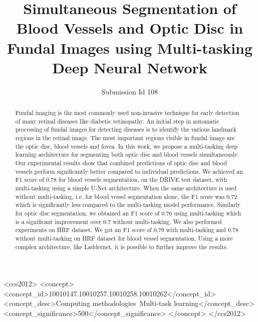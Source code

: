 \documentclass[sigconf, review=true]{acmart}
\begin{document}
\title{Simultaneous Segmentation of Blood Vessels and Optic Disc in Fundal Images using Multi-tasking Deep Neural Network}

\author{Submission Id 108}
\affiliation{%
  \institution{}
  \streetaddress{}
  \city{}
  \state{}
  \country{}
  \postcode{}
}


\renewcommand{\shortauthors}{}


\begin{abstract}
Fundal imaging is the most commonly used non-invasive technique for early detection of many retinal diseases like diabetic retinopathy.
An initial step in automatic processing of fundal images for detecting diseases is to identify the various landmark regions in the retinal image.
The most important regions visible in fundal image are the optic disc, blood vessels and fovea.
In this work, we propose a multi-tasking deep learning architecture for segmenting both optic disc and blood vessels simultaneously.
Our experimental results show that combined predictions of optic disc and blood vessels  perform significantly better compared to individual predictions.
We achieved an F1 score of 0.78 for blood vessels segmentation, on the DRIVE test dataset, with multi-tasking using a simple U-Net architecture.
When the same architecture is used without multi-tasking, i.e. for blood vessel segmentation alone, the F1 score was 0.72 which is significantly less compared to the multi-tasking model performance.
Similarly for optic disc segmentation, we obtained an F1 score of 0.76 using multi-tasking which is a significant improvement over 0.7 without multi-tasking.
We also performed experiments on HRF dataset.
We got an F1 score of 0.79 with multi-tasking and 0.78 without multi-tasking on HRF dataset for blood vessel segmentation.
Using a more complex architecture, like Laddernet, it is possible to further improve the results.

\end{abstract}

%
%
\begin{CCSXML}
<ccs2012>
<concept>
<concept_id>10010147.10010257.10010258.10010262</concept_id>
<concept_desc>Computing methodologies~Multi-task learning</concept_desc>
<concept_significance>500</concept_significance>
</concept>
</ccs2012>
\end{CCSXML}



\maketitle






\appendix
\end{document}

